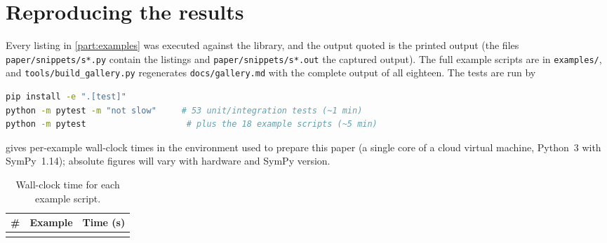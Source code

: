 \section{Reproducing the results}
\label{app:repro}

Every listing in \cref{part:examples} was executed against the library, and the output quoted is the printed output (the files \texttt{paper/snippets/s*.py} contain the listings and \texttt{paper/snippets/s*.out} the captured output). The full example scripts are in \texttt{examples/}, and \texttt{tools/build\_gallery.py} regenerates \texttt{docs/gallery.md} with the complete output of all eighteen. The tests are run by
\begin{lstlisting}[language=bash,frame=single]
pip install -e ".[test]"
python -m pytest -m "not slow"     # 53 unit/integration tests (~1 min)
python -m pytest                    # plus the 18 example scripts (~5 min)
\end{lstlisting}
 gives per-example wall-clock times in the environment used to prepare this paper (a single core of a cloud virtual machine, Python~3 with SymPy~1.14); absolute figures will vary with hardware and SymPy version.
\begin{table}[H]
\centering\small
\begin{tabular}{@{}rlr@{}}
\toprule
\# & Example & Time (s) \\
\midrule
\\
\bottomrule
\end{tabular}
\caption{Wall-clock time for each example script.}
\label{tab:timings}
\end{table}
